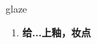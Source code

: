 
\begin{frame}
{\huge glaze}
\begin{center}
\begin{enumerate}\Large
  \item \textbf{给...上釉，妆点}
\end{enumerate}
\end{center}
\end{frame}
